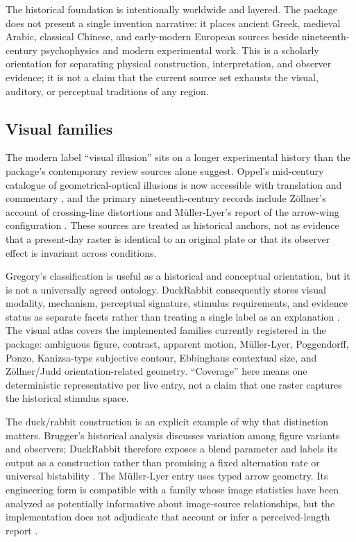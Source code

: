\documentclass[
  english,
]{article}
\begin{document}
The historical foundation is intentionally worldwide and layered. The
package does not present a single invention narrative: it places ancient
Greek, medieval Arabic, classical Chinese, and early-modern European
sources beside nineteenth-century psychophysics and modern experimental
work. This is a scholarly orientation for separating physical
construction, interpretation, and observer evidence; it is not a claim
that the current source set exhausts the visual, auditory, or perceptual
traditions of any region.

\subsection{Visual families}\label{visual-families}

The modern label ``visual illusion'' sits on a longer experimental
history than the package's contemporary review sources alone suggest.
Oppel's mid-century catalogue of geometrical-optical illusions is now
accessible with translation and commentary \citep{wade2017oppel}, and
the primary nineteenth-century records include Zöllner's account of
crossing-line distortions and Müller-Lyer's report of the arrow-wing
configuration \citep{zoellner1860pseudoscopy, mullerlyer1889optical}.
These sources are treated as historical anchors, not as evidence that a
present-day raster is identical to an original plate or that its
observer effect is invariant across conditions.

Gregory's classification is useful as a historical and conceptual
orientation, but it is not a universally agreed ontology. DuckRabbit
consequently stores visual modality, mechanism, perceptual signature,
stimulus requirements, and evidence status as separate facets rather
than treating a single label as an explanation
\citep{gregory1997visual}. The visual atlas covers the implemented
families currently registered in the package: ambiguous figure,
contrast, apparent motion, Müller-Lyer, Poggendorff, Ponzo, Kanizsa-type
subjective contour, Ebbinghaus contextual size, and Zöllner/Judd
orientation-related geometry. ``Coverage'' here means one deterministic
representative per live entry, not a claim that one raster captures the
historical stimulus space.

The duck/rabbit construction is an explicit example of why that
distinction matters. Brugger's historical analysis discusses variation
among figure variants and observers; DuckRabbit therefore exposes a
blend parameter and labels its output as a construction rather than
promising a fixed alternation rate or universal bistability
\citep{brugger1999duckrabbit}. The Müller-Lyer entry uses typed arrow
geometry. Its engineering form is compatible with a family whose image
statistics have been analyzed as potentially informative about
image-source relationships, but the implementation does not adjudicate
that account or infer a perceived-length report
\citep{mullerlyer1889optical, howe2005muller}.
\end{document}
